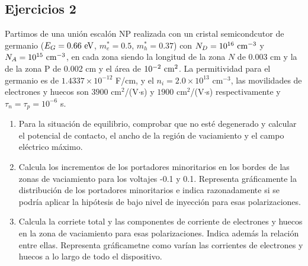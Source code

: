 \begin{Enunciado}
\subsection*{Ejercicios 2}

Partimos de una unión escalón NP realizada con un cristal semicondcutor de germanio ($E_G = 0.66 \ \eV$, $m_e^*=0.5$, $m_h^* = 0.37$) con $N_D=10^{16} \ \text{cm}^{-3}$ y $N_A = 10^{15} \ \text{cm}^{-3}$, en cada zona siendo la longitud de la zona $N$ de 0.003 cm y la de la zona P de 0.002 cm y el área de $10^{-2} \ \text{cm}^2$. La permitividad para el germanio es de $1.4337 \times 10^{-12}$ F/cm, y el $n_i=2.0 \times 10^{13}$ cm$^{-3}$, las movilidades de electrones y huecos son $3900$ cm$^2$/(V$\cdot$s) y $1900$ cm$^2$/(V$\cdot$s) respectivamente y $\tau_n=\tau_p=10^{-6}$ s.

\begin{enumerate}[label=\alph*)]
    \item Para la situación de equilibrio, comprobar que no esté degenerado y calcular el potencial de contacto, el ancho de la región de vaciamiento y el campo eléctrico máximo.
    \item Calcula los incrementos de los portadores minoritarios en los bordes de las zonas de vaciamiento para los voltajes -0.1 y 0.1. Representa gráficamente la distribución de los portadores minoritarios e indica razonadamente si se podría aplicar la hipótesis de bajo nivel de inyección para esas polarizaciones.
    \item Calcula la corriete total y las componentes de corriente de electrones y huecos en la zona de vaciamiento para esas polarizaciones. Indica además la relación entre ellas. Representa gráficametne como varían las corrientes de electrones y huecos a lo largo de todo el dispositivo. 
\end{enumerate}
\end{Enunciado}


